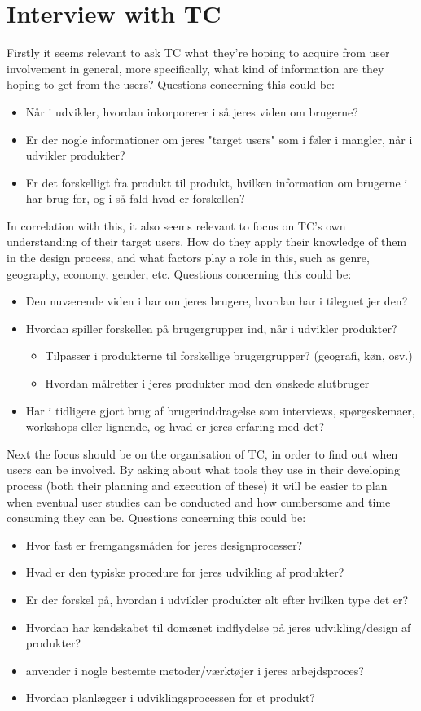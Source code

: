 \section{Interview with TC}
\label{InterviewInputs}
Firstly it seems relevant to ask TC what they're hoping to acquire from user involvement in general, more specifically, what kind of information are they hoping to get from the users? Questions concerning this could be:
%
\begin{itemize}
	\item Når i udvikler, hvordan inkorporerer i så jeres viden om brugerne?
	\item Er der nogle informationer om jeres "target users" som i føler i mangler, når i udvikler produkter?
	\item Er det forskelligt fra produkt til produkt, hvilken information om brugerne i har brug for, og i så fald hvad er forskellen?
\end{itemize}
%
\noindent
In correlation with this, it also seems relevant to focus on TC's own understanding of their target users. How do they apply their knowledge of them in the design process, and what factors play a role in this, such as genre, geography, economy, gender, etc. Questions concerning this could be:
%
\begin{itemize}
	\item Den nuværende viden i har om jeres brugere, hvordan har i tilegnet jer den?
	\item Hvordan spiller forskellen på brugergrupper ind, når i udvikler produkter?
		\begin{itemize}
		\item Tilpasser i produkterne til forskellige brugergrupper? (geografi, køn, osv.)
		\item Hvordan målretter i jeres produkter mod den ønskede slutbruger
		\end{itemize}
	\item Har i tidligere gjort brug af brugerinddragelse som interviews, spørgeskemaer, workshops eller lignende, og hvad er jeres erfaring med det?
\end{itemize}
%
\noindent
Next the focus should be on the organisation of TC, in order to find out when users can be involved. By asking about what tools they use in their developing process (both their planning and execution of these) it will be easier to plan when eventual user studies can be conducted and how cumbersome and time consuming they can be. Questions concerning this could be:
%
\begin{itemize}
	\item Hvor fast er fremgangsmåden for jeres designprocesser?
	\item Hvad er den typiske procedure for jeres udvikling af produkter?
	\item Er der forskel på, hvordan i udvikler produkter alt efter hvilken type det er?
	\item Hvordan har kendskabet til domænet indflydelse på jeres udvikling/design af produkter?
	\item anvender i nogle bestemte metoder/værktøjer i jeres arbejdsproces?
	\item Hvordan planlægger i udviklingsprocessen for et produkt?
\end{itemize}

